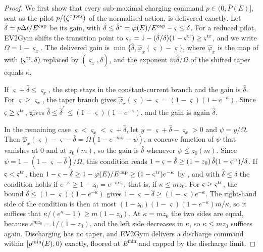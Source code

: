 \begin{proof}
We first show that every sub-maximal charging command $p\in(0,\bar P(E)]$, sent as the pilot $p/(\zeta^{\mathrm c}P^{\mathrm{cs}})$ of the normalised action, is delivered exactly.
Let $\hat\delta=p\Delta t/E^{\mathrm{cap}}$ be its gain, with $\hat\delta\le\hat\delta^{*}=\varphi(E)/E^{\mathrm{cap}}-\varsigma\le\delta$.
For a reduced pilot, EV2Gym shifts the transition point to $\varsigma_x=1-(\hat\delta/\delta)(1-\varsigma^{\mathrm{tr}})\ge\varsigma^{\mathrm{tr}}$, and we write $\Omega=1-\varsigma_x$.
The delivered gain is $\min\{\hat\delta,\hat\varphi_x(\varsigma)-\varsigma\}$, where $\hat\varphi_x$ is the map of  with $(\varsigma^{\mathrm{tr}},\delta)$ replaced by $(\varsigma_x,\hat\delta)$, and the exponent $m\hat\delta/\Omega$ of the shifted taper equals $\kappa$.

If $\varsigma+\hat\delta\le\varsigma_x$, the step stays in the constant-current branch and the gain is $\hat\delta$.
For $\varsigma\ge\varsigma_x$, the taper branch gives $\hat\varphi_x(\varsigma)-\varsigma=(1-\varsigma)(1-e^{-\kappa})$.
Since $\varsigma\ge\varsigma^{\mathrm{tr}}$,  gives $\hat\delta\le\hat\delta^{*}\le(1-\varsigma)(1-e^{-\kappa})$, and the gain is again $\hat\delta$.

In the remaining case $\varsigma<\varsigma_x<\varsigma+\hat\delta$, let $y=\varsigma+\hat\delta-\varsigma_x>0$ and $\psi=y/\Omega$.
Then $\hat\varphi_x(\varsigma)-\varsigma-\hat\delta=\Omega(1-e^{-m\psi}-\psi)$, a concave function of $\psi$ that vanishes at 0 and at $z_0(m)$, so the gain is $\hat\delta$ whenever $\psi\le z_0(m)$.
Since $\psi=1-(1-\varsigma-\hat\delta)/\Omega$, this condition reads $1-\varsigma-\hat\delta\ge(1-z_0)\,\hat\delta(1-\varsigma^{\mathrm{tr}})/\delta$.
If $\varsigma<\varsigma^{\mathrm{tr}}$, then $1-\varsigma-\hat\delta\ge1-\varphi(E)/E^{\mathrm{cap}}\ge(1-\varsigma^{\mathrm{tr}})e^{-\kappa}$ by , and with $\hat\delta\le\delta$ the condition holds if $e^{-\kappa}\ge1-z_0=e^{-mz_0}$, that is, if $\kappa\le mz_0$.
For $\varsigma\ge\varsigma^{\mathrm{tr}}$, the bound $\hat\delta\le(1-\varsigma)(1-e^{-\kappa})$ gives $1-\varsigma-\hat\delta\ge(1-\varsigma)e^{-\kappa}$.
The right-hand side of the condition is then at most $(1-z_0)(1-\varsigma)(1-e^{-\kappa})m/\kappa$, so it suffices that $\kappa/(e^{\kappa}-1)\ge m(1-z_0)$.
At $\kappa=mz_0$ the two sides are equal, because $e^{mz_0}=1/(1-z_0)$, and the left side decreases in $\kappa$, so $\kappa\le mz_0$ suffices again.
Discharging has no taper, and EV2Gym delivers a discharge command within $[p^{\min}(E),0)$ exactly, floored at $E^{\min}$ and capped by the discharge limit.


\end{proof}
